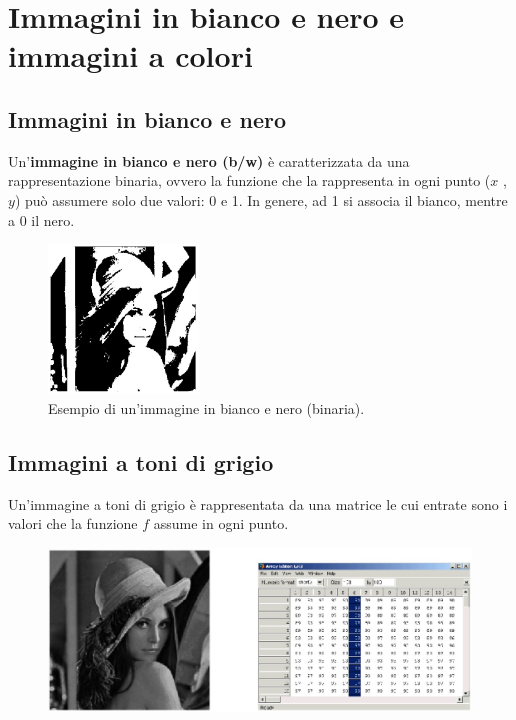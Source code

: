 \section{Immagini in bianco e nero e immagini a colori}

\subsection{Immagini in bianco e nero}

Un'\textbf{immagine in bianco e nero (b/w)} è caratterizzata da una
rappresentazione binaria, ovvero la funzione che la rappresenta in
ogni punto ($x$ , $y$) può assumere solo due valori: 0 e 1. In genere,
ad 1 si associa il bianco, mentre a 0 il nero.

\begin{figure}[H]
    \centering
    \includegraphics[width=4cm, keepaspectratio]{capitoli/immagini/imgs/immagine_binaria_bianco_nero.jpg}
    \caption{Esempio di un'immagine in bianco e nero (binaria).}
\end{figure}

\subsection{Immagini a toni di grigio}

Un'immagine a toni di grigio è rappresentata da una matrice le cui
entrate sono i valori che la funzione $f$ assume in ogni punto.

\begin{figure}[H]
    \centering
    \includegraphics[width=12cm, keepaspectratio]{capitoli/immagini/imgs/rappresentazione_immagine_toni_grigio.jpg}
\end{figure}

